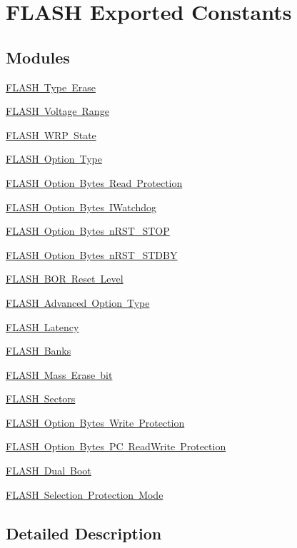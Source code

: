 \hypertarget{group___f_l_a_s_h_ex___exported___constants}{}\section{F\+L\+A\+SH Exported Constants}
\label{group___f_l_a_s_h_ex___exported___constants}
\subsection*{Modules}
\begin{DoxyCompactItemize}
\item 
\mbox{\hyperlink{group___f_l_a_s_h_ex___type___erase}{F\+L\+A\+S\+H Type Erase}}
\item 
\mbox{\hyperlink{group___f_l_a_s_h_ex___voltage___range}{F\+L\+A\+S\+H Voltage Range}}
\item 
\mbox{\hyperlink{group___f_l_a_s_h_ex___w_r_p___state}{F\+L\+A\+S\+H W\+R\+P State}}
\item 
\mbox{\hyperlink{group___f_l_a_s_h_ex___option___type}{F\+L\+A\+S\+H Option Type}}
\item 
\mbox{\hyperlink{group___f_l_a_s_h_ex___option___bytes___read___protection}{F\+L\+A\+S\+H Option Bytes Read Protection}}
\item 
\mbox{\hyperlink{group___f_l_a_s_h_ex___option___bytes___i_watchdog}{F\+L\+A\+S\+H Option Bytes I\+Watchdog}}
\item 
\mbox{\hyperlink{group___f_l_a_s_h_ex___option___bytes__n_r_s_t___s_t_o_p}{F\+L\+A\+S\+H Option Bytes n\+R\+S\+T\+\_\+\+S\+T\+OP}}
\item 
\mbox{\hyperlink{group___f_l_a_s_h_ex___option___bytes__n_r_s_t___s_t_d_b_y}{F\+L\+A\+S\+H Option Bytes n\+R\+S\+T\+\_\+\+S\+T\+D\+BY}}
\item 
\mbox{\hyperlink{group___f_l_a_s_h_ex___b_o_r___reset___level}{F\+L\+A\+S\+H B\+O\+R Reset Level}}
\item 
\mbox{\hyperlink{group___f_l_a_s_h_ex___advanced___option___type}{F\+L\+A\+S\+H Advanced Option Type}}
\item 
\mbox{\hyperlink{group___f_l_a_s_h___latency}{F\+L\+A\+S\+H Latency}}
\item 
\mbox{\hyperlink{group___f_l_a_s_h_ex___banks}{F\+L\+A\+S\+H Banks}}
\item 
\mbox{\hyperlink{group___f_l_a_s_h_ex___mass_erase__bit}{F\+L\+A\+S\+H Mass Erase bit}}
\item 
\mbox{\hyperlink{group___f_l_a_s_h_ex___sectors}{F\+L\+A\+S\+H Sectors}}
\item 
\mbox{\hyperlink{group___f_l_a_s_h_ex___option___bytes___write___protection}{F\+L\+A\+S\+H Option Bytes Write Protection}}
\item 
\mbox{\hyperlink{group___f_l_a_s_h_ex___option___bytes___p_c___read_write___protection}{F\+L\+A\+S\+H Option Bytes P\+C Read\+Write Protection}}
\item 
\mbox{\hyperlink{group___f_l_a_s_h_ex___dual___boot}{F\+L\+A\+S\+H Dual Boot}}
\item 
\mbox{\hyperlink{group___f_l_a_s_h_ex___selection___protection___mode}{F\+L\+A\+S\+H Selection Protection Mode}}
\end{DoxyCompactItemize}


\subsection{Detailed Description}
